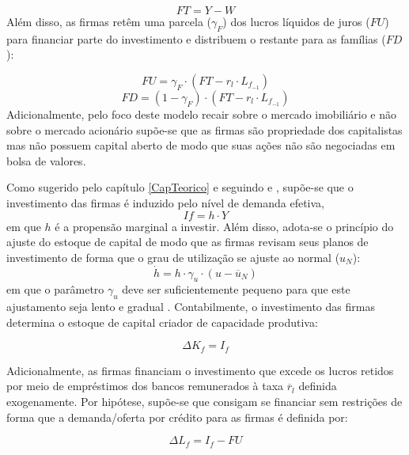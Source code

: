 \begin{equation}
    FT = Y - W
\end{equation}
Além disso, as firmas retêm uma parcela ($\gamma_F$) dos lucros líquidos de juros ($FU$) para financiar parte do investimento e distribuem o restante para as famílias ($FD$):

\begin{equation}
    FU = \gamma_F\cdot (FT - r_l\cdot L_{f_{-1}})
\end{equation}
\begin{equation}
    FD = (1-\gamma_F)\cdot (FT - r_l\cdot L_{f_{-1}})
\end{equation}
Adicionalmente, pelo foco deste modelo recair sobre o mercado imobiliário e não sobre o mercado acionário supõe-se que as firmas são propriedade dos capitalistas mas não possuem capital aberto de modo que suas ações não são negociadas em bolsa de valores.

Como sugerido pelo capítulo \ref{CapTeorico} e seguindo \textcite{serrano_long_1995} e \textcite{serrano_sraffian_2017}, supõe-se que o investimento das firmas é induzido pelo nível de demanda efetiva,
\begin{equation}
\label{_If}
    If = h\cdot Y
\end{equation}
em que $h$ é a propensão marginal a investir. Além disso, adota-se o princípio do ajuste do estoque de capital de modo que as firmas revisam seus planos de investimento de forma que o grau de utilização se ajuste ao normal ($u_N$):
\begin{equation}
\label{_h}
    \dot h = h\cdot \gamma_u\cdot (u - \overline{u}_N)
\end{equation}
em que o parâmetro $\gamma_u$ deve ser suficientemente pequeno para que este ajustamento seja lento e gradual \cite[p.~271]{freitas_growth_2015}. Contabilmente, o investimento das firmas determina o estoque de capital criador de capacidade produtiva:

\begin{equation}
    \Delta K_f = I_f
\end{equation}

Adicionalmente, as firmas financiam o investimento que excede os lucros retidos por meio de empréstimos dos bancos remunerados à taxa $\overline r_l$ definida exogenamente. Por hipótese, supõe-se que consigam se financiar sem restrições de forma que a demanda/oferta por crédito para as firmas é definida por:

\begin{equation}
    \Delta L_f = I_f - FU
\end{equation}

